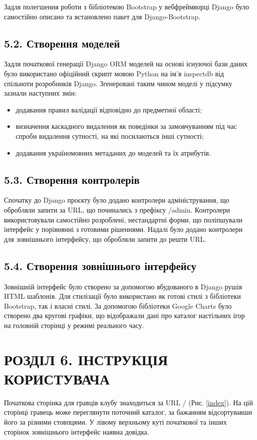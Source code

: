 \documentclass[a4paper, 14pt]{extarticle}
\begin{document}
  Задля полегшення роботи з бібліотекою Bootstrap у вебфреймворці Django
  було самостійно описано та встановлено пакет для Django-Bootstrap.


  \subsection{5.2. Створення моделей}
  Задля початкової генерації Django ORM моделей на основі існуючої бази даних було
  використано офіційний скрипт мовою Python на ім'я inspectdb
  від спільноти розробників Django. Згенеровані таким чином моделі у підсумку зазнали
  наступних змін:

  \begin{itemize}[nosep]
    \item додавання правил валідації відповідно до предметної області;
    \item визначення каскадного видалення як поведінки за замовчуванням
      під час спроби видалення сутності, на які посилаються інші сутності;
    \item додавання україномовних метаданих до моделей та їх атрибутів.
  \end{itemize}

  \subsection{5.3. Створення контролерів}
  Спочатку до Django проєкту було додано контролери адміністрування, що обробляли запити
  за URL, що починались з префіксу /admin. Контролери використовували самостійно розроблені,
  нестандартні форми, що поліпшували інтерфейс у порівнянні з готовими рішеннями.
  Надалі було додано контролери для зовнішнього інтерфейсу, що обробляли запити до решти
  URL.

  \subsection{5.4. Створення зовнішнього інтерфейсу}
  Зовнішній інтерфейс було створено за допомогою вбудованого в Django рушія HTML шаблонів.
  Для стилізації було використано як готові стилі з бібліотеки Bootstrap, так і власні
  стилі. За допомогою бібліотеки Google Charts було створено два кругові графіки, що
  відображали дані про каталог настільних ігор на головній сторінці у режимі реального часу.

  \clearpage
  \section{РОЗДІЛ 6. ІНСТРУКЦІЯ КОРИСТУВАЧА}
  Початкова сторінка для гравців клубу знаходиться за URL / (Рис. \ref{index}).
  На цій сторінці гравець може
  переглянути поточний каталог, за бажанням відсортувавши його за різними стовпцями.
  У лівому верхньому куті початкової та інших сторінок зовнішнього інтерфейс наявна
  довідка.
\end{document}
